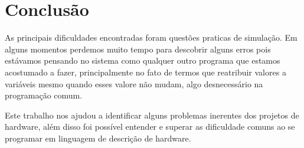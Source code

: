 \documentclass[12pt]{article}
\begin{document}
\section{Conclusão}
\label{conclusao}

As principais dificuldades encontradas foram questões praticas de simulação. Em alguns momentos perdemos muito tempo para descobrir alguns erros pois estávamos pensando no sistema como qualquer outro programa que estamos acostumado a fazer, principalmente no fato de termos que reatribuir valores a variáveis mesmo quando esses valore não mudam, algo desnecessário na programação comum.

Este trabalho nos ajudou a identificar alguns problemas inerentes dos projetos de hardware, além disso foi possível entender e superar as dificuldade comuns ao se programar em linguagem de descrição de hardware.



\end{document}
